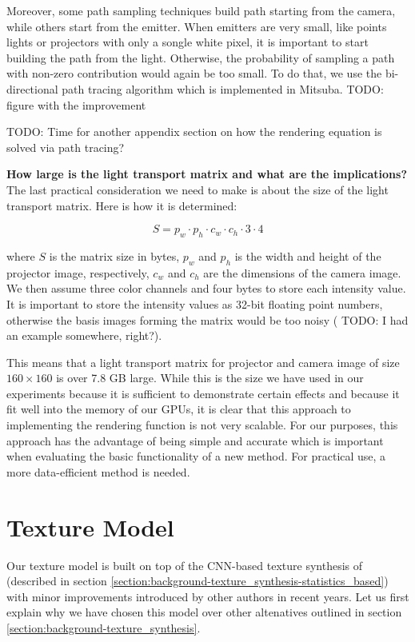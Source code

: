 Moreover, some path sampling techniques build path starting from the camera, while others start from the emitter. When emitters are very small, like points lights or projectors with only a songle white pixel, it is important to start building the path from the light. Otherwise, the probability of sampling a path with non-zero contribution would again be too small. To do that, we use the bi-directional path tracing algorithm which is implemented in Mitsuba. {\color{red} TODO: figure with the improvement}

{\color{red} TODO: Time for another appendix section on how the rendering equation is solved via path tracing?}

\textbf{How large is the light transport matrix and what are the implications?} The last practical consideration we need to make is about the size of the light transport matrix. Here is how it is determined:

\begin{equation}
    \label{eq:lt_matrix_size}
    S = p_w \cdot p_h \cdot c_w \cdot c_h \cdot 3 \cdot 4
\end{equation}

where \(S\) is the matrix size in bytes, \(p_w\) and \(p_h\) is the width and height of the projector image, respectively, \(c_w\) and \(c_h\) are the dimensions of the camera image. We then assume three color channels and four bytes to store each intensity value. It is important to store the intensity values as 32-bit floating point numbers, otherwise the basis images forming the matrix would be too noisy ({\color{red} TODO: I had an example somewhere, right?}).

This means that a light transport matrix for projector and camera image of size \(160 \times 160\) is over 7.8 GB large. While this is the size we have used in our experiments because it is sufficient to demonstrate certain effects and because it fit well into the memory of our GPUs, it is clear that this approach to implementing the rendering function is not very scalable. For our purposes, this approach has the advantage of being simple and accurate which is important when evaluating the basic functionality of a new method. For practical use, a more data-efficient method is needed.

\section{Texture Model}
\label{section:methods-texture_model}

Our texture model is built on top of the CNN-based texture synthesis of \citet{Gatys2015} (described in section \ref{section:background-texture_synthesis-statistics_based}) with minor improvements introduced by other authors in recent years. Let us first explain why we have chosen this model over other altenatives outlined in section \ref{section:background-texture_synthesis}.

